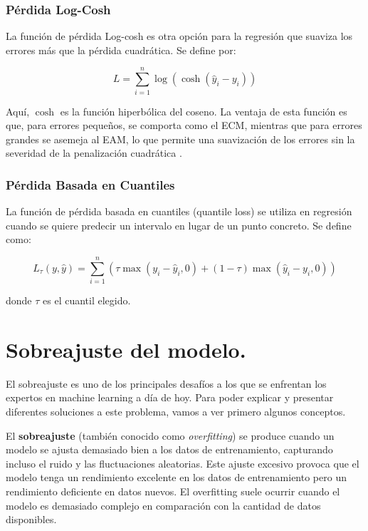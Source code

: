 \subsubsection{Pérdida Log-Cosh}

La función de pérdida Log-cosh es otra opción para la regresión que suaviza los errores más que la pérdida cuadrática. Se define por:

\begin{equation}
    L = \sum_{i=1}^{n} \log(\cosh(\hat{y}_i - y_i))
\end{equation}

Aquí, \(\cosh\) es la función hiperbólica del coseno. La ventaja de esta función es que, para errores pequeños, se comporta como el ECM, mientras que para errores grandes se asemeja al EAM, lo que permite una suavización de los errores sin la severidad de la penalización cuadrática \cite{pajares2021aprendizaje}.

\subsubsection{Pérdida Basada en Cuantiles}

La función de pérdida basada en cuantiles (quantile loss) se utiliza en regresión cuando se quiere predecir un intervalo en lugar de un punto concreto. Se define como:

\begin{equation}
    L_{\tau}(y, \hat{y}) = \sum_{i=1}^{n} \left(\tau \max(y_i - \hat{y}_i, 0) + (1 - \tau) \max(\hat{y}_i - y_i, 0)\right)
\end{equation}

donde \(\tau\) es el cuantil elegido.














\section{Sobreajuste del modelo.}

El sobreajuste es uno de los principales desafíos a los que se enfrentan los expertos en machine learning a día de hoy. Para poder explicar y presentar diferentes soluciones a este problema, vamos a ver primero algunos conceptos.


El \textbf{sobreajuste} (también conocido como \textit{overfitting}) se produce cuando un modelo se ajusta demasiado bien a los datos de entrenamiento, capturando incluso el ruido y las fluctuaciones aleatorias. Este ajuste excesivo provoca que el modelo tenga un rendimiento excelente en los datos de entrenamiento pero un rendimiento deficiente en datos nuevos. El overfitting suele ocurrir cuando el modelo es demasiado complejo en comparación con la cantidad de datos disponibles.

